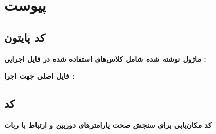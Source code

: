 \chapter*{‌پیوست}
	\section*{کد پایتون }
	\textbf{ماژول نوشته شده شامل کلاس‌های استفاده شده در فایل اجرایی :}
	\begin{latin}
		
	\end{latin}
	
	\textbf{فایل اصلی جهت اجرا :}
	
	\begin{latin}
		
	\end{latin}
	\section{کد }
	\textbf{کد مکان‌یابی برای سنجش صحت پارامتر‌های دوربین و ارتباط با ربات}
	\begin{latin}
		
	\end{latin}
	

